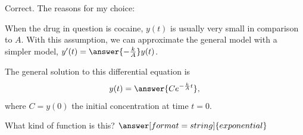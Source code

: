 \documentclass{ximera}
\begin{document}
\begin{question}
\begin{question}
Correct.  The reasons for my choice:  
\begin{selectAll}
\end{selectAll}
\end{question}
\end{question}


\begin{question}
When the drug in question is cocaine, $y(t)$ is usually very small in comparison to $A$.   With this assumption, we can approximate the general model with a simpler model, $y'(t)=\answer{-\frac{k}{A}}y(t)$.    

The general solution to this differential equation is 
\[  
y(t) =\answer{Ce^{-\frac{k}{A}t}}, 
\]
where $C=y(0)$ the initial concentration at time $t=0$.  

What kind of function is this? $\answer[format=string]{exponential}$
\end{question}
\end{document}
